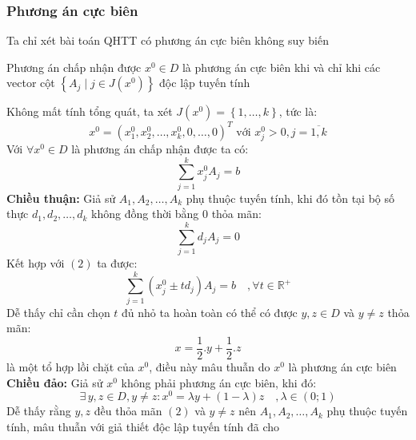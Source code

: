 \documentclass[12pt,a4paper]{article}\author{Nguyễn Nho Dũng}
\newcommand{\kniem}[1]{{\sffamily\bfseries #1}}
\newcommand{\khoang}[2]{\left(#1;#2\right)}
\newcommand{\taphop}[1]{\left\{#1\right\}}
\newcommand{\ngoacto}[1]{\left(#1\right)}
\newcommand{\tonglanluot}[2]{\sum_{#1}^{#2}}
\begin{document}
\subsubsection{Phương án cực biên}
\begin{chuy}
	Ta chỉ xét bài toán QHTT có phương án cực biên không suy biến
\end{chuy}
\begin{dly}
	Phương án chấp nhận được $x^0\in D$ là phương án cực biên khi và chỉ khi các vector cột $\taphop{A_j \mid j \in J(x^0)}$ độc lập tuyến tính
\end{dly}
\begin{cm}
	Không mất tính tổng quát, ta xét $J(x^0) = \taphop{1,\ldots,k}$, tức là: 
	$$x^0 = \ngoacto{x^0_1, x^0_2, \ldots, x^0_k, 0, \ldots, 0}^T\text{ với } x^0_j > 0, j = \overline{1,k}$$
	Với $\forall x^0 \in D$ là phương án chấp nhận được ta có:
	\begin{equation} \label{eq:1}
		\tonglanluot{j=1}{k} x^0_j A_j = b
	\end{equation}
	\kniem{Chiều thuận:} Giả sử $A_1, A_2, \ldots, A_k$ phụ thuộc tuyến tính, khi đó tồn tại bộ số thực $d_1, d_2, \ldots, d_k$ không đồng thời bằng $0$ thỏa mãn:
	\begin{equation}
		\tonglanluot{j=1}{k} d_jA_j = 0
	\end{equation}
	Kết hợp với $(2)$ ta được: 
	\begin{equation}
		\tonglanluot{j=1}{k} \ngoacto{x^0_j \pm td_j}A_j = b\quad, \forall t\in \mathbb{R}^+
	\end{equation}
	Dễ thấy chỉ cần chọn $t$ đủ nhỏ ta hoàn toàn có thể có được $y, z\in D$ và $y \neq z$ thỏa mãn:
	\begin{equation}
		x = \dfrac{1}{2}. y +\dfrac{1}{2}. z
	\end{equation}
	là một tổ hợp lồi chặt của $x^0$, điều này mâu thuẫn do $x^0$ là phương án cực biên\\
	\kniem{Chiều đảo:} Giả sử $x^0$ không phải phương án cực biên, khi đó:
	\begin{equation}
		\exists\, y, z\in D, y\neq z: x^0 = \lambda y +(1-\lambda) z \quad, \lambda\in\khoang{0}{1}
	\end{equation}
	Dễ thấy rằng $y, z$ đều thỏa mãn $(2)$ và $y\neq z$ nên $A_1, A_2, \ldots, A_k$ phụ thuộc tuyến tính, mâu thuẫn với giả thiết độc lập tuyến tính đã cho 
\end{cm}
\end{document}
